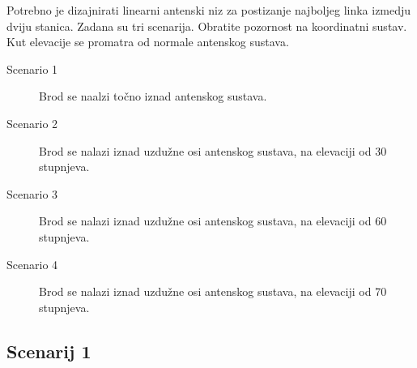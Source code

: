 \documentclass{article}[a4paper]
\begin{document}
Potrebno je dizajnirati linearni antenski niz za postizanje najboljeg linka izmedju dviju stanica. Zadana su tri scenarija. Obratite pozornost na koordinatni sustav. Kut elevacije se promatra od normale antenskog sustava.
\begin{description}
	\item[Scenario 1] Brod se naalzi točno iznad antenskog sustava.
	\item[Scenario 2] Brod se nalazi iznad uzdužne osi antenskog sustava, na elevaciji od 30 stupnjeva.
	\item[Scenario 3] Brod se nalazi iznad uzdužne osi antenskog sustava, na elevaciji od 60 stupnjeva.
	\item[Scenario 4] Brod se nalazi iznad uzdužne osi antenskog sustava, na elevaciji od 70 stupnjeva.
\end{description}
\subsection*{Scenarij 1}
\end{document}
